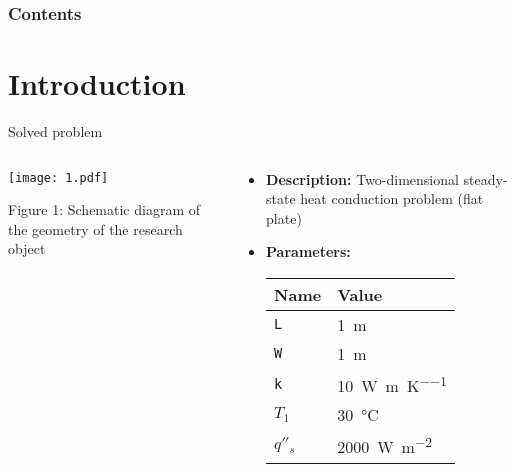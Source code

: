 \documentclass{beamer}
\begin{document}
\begin{frame}
    \titlepage
\end{frame}

\begin{frame}
    \frametitle{Contents}
    \tableofcontents
\end{frame}

\section{Introduction}
\begin{frame}{Solved problem}
    \begin{columns}
        \begin{column}{0.5\textwidth}
            \centering
            \texttt{[image: 1.pdf]} %
            \caption{\footnotesize Figure 1: Schematic diagram of the geometry of the research object}
        \end{column}

        \begin{column}{0.5\textwidth}
            \begin{itemize}
                \item \textbf{Description:} Two-dimensional steady-state heat conduction problem (flat plate)
                \item \textbf{Parameters:}
                \begin{table}[!htbp]
                    \centering
                    \begin{tabular}{l  | l}
                        \hline
                        Name & Value \\
                        \hline
                        \texttt{L}  & \SI{1}{\meter}\\
                        \texttt{W} & \SI{1}{\meter}  \\
                        \texttt{k}  & \SI{10}{\watt\per\meter\per\kelvin} \\
                        \texttt{$T_1$}& \SI{30}{\celsius} \\
                        \texttt{$q''_s$}& \SI{2000}{\watt\per\meter\squared}  \\
                        \hline
                    \end{tabular}
                    \label{doc}
                \end{table}
            \end{itemize}
        \end{column}
    \end{columns}
\end{frame}
\end{document}
